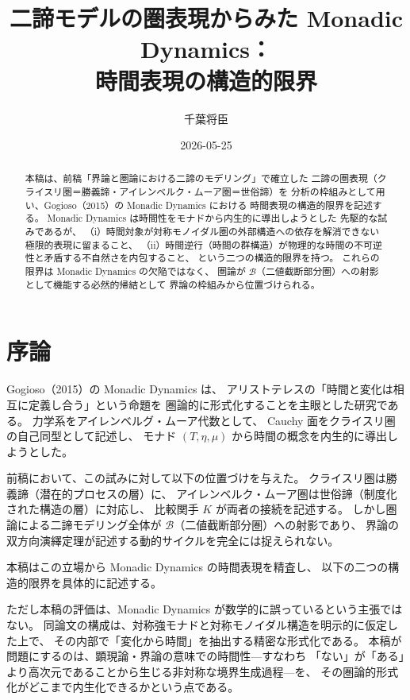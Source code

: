 \documentclass[11pt,a4paper]{ltjsarticle}
\newcommand{\Bval}{\mathcal{B}}
\theoremstyle{definition}
\begin{document}
\title{二諦モデルの圏表現からみた Monadic Dynamics：\\
時間表現の構造的限界}
\author{千葉将臣}
\date{2026-05-25}
\maketitle

\begin{abstract}
本稿は、前稿「界論と圏論における二諦のモデリング」で確立した
二諦の圏表現（クライスリ圏＝勝義諦・アイレンベルク・ムーア圏＝世俗諦）を
分析の枠組みとして用い、Gogioso（2015）の Monadic Dynamics における
時間表現の構造的限界を記述する。
Monadic Dynamics は時間性をモナドから内生的に導出しようとした
先駆的な試みであるが、
（i）時間対象が対称モノイダル圏の外部構造への依存を解消できない極限的表現に留まること、
（ii）時間逆行（時間の群構造）が物理的な時間の不可逆性と矛盾する不自然さを内包すること、
という二つの構造的限界を持つ。
これらの限界は Monadic Dynamics の欠陥ではなく、
圏論が $\Bval$（二値截断部分圏）への射影として機能する必然的帰結として
界論の枠組みから位置づけられる。
\end{abstract}

\tableofcontents
\newpage

\section{序論}

Gogioso（2015）の Monadic Dynamics\cite{Gogioso2015} は、
アリストテレスの「時間と変化は相互に定義し合う」という命題を
圏論的に形式化することを主眼とした研究である。
力学系をアイレンベルグ・ムーア代数として、
Cauchy 面をクライスリ圏の自己同型として記述し、
モナド $(T, \eta, \mu)$ から時間の概念を内生的に導出しようとした。

前稿\cite{Chiba2026_nitatai}において、この試みに対して以下の位置づけを与えた。
クライスリ圏は勝義諦（潜在的プロセスの層）に、
アイレンベルク・ムーア圏は世俗諦（制度化された構造の層）に対応し、
比較関手 $K$ が両者の接続を記述する。
しかし圏論による二諦モデリング全体が $\Bval$（二値截断部分圏）への射影であり、
界論の双方向演繹定理が記述する動的サイクルを完全には捉えられない。

本稿はこの立場から Monadic Dynamics の時間表現を精査し、
以下の二つの構造的限界を具体的に記述する。

ただし本稿の評価は、Monadic Dynamics が数学的に誤っているという主張ではない。
同論文の構成は、対称強モナドと対称モノイダル構造を明示的に仮定した上で、
その内部で「変化から時間」を抽出する精密な形式化である。
本稿が問題にするのは、顕現論・界論の意味での時間性---すなわち
「ない」が「ある」より高次元であることから生じる非対称な境界生成過程---を、
その圏論的形式化がどこまで内生化できるかという点である。
\end{document}
